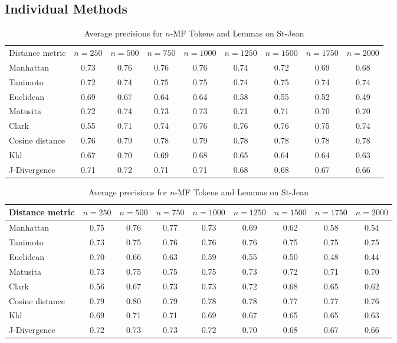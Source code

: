 \subsection{Individual Methods}

\begin{table}[H]
  \centering
  \caption{Average precisions for $n$-MF Tokens and Lemmas on St-Jean}
  \label{tab:tokens_lemmas}

  \label{tab:tokens}
  \begin{tabular}{l c c c c c c c c}
    \toprule
    Distance metric &
    $n=250$ &
    $n=500$ &
    $n=750$ &
    $n=1000$ &
    $n=1250$ &
    $n=1500$ &
    $n=1750$ &
    $n=2000$ \\
    Manhattan       & 0.73 & 0.76 & 0.76 & 0.76 & 0.74 & 0.72 & 0.69 & 0.68 \\
    Tanimoto        & 0.72 & 0.74 & 0.75 & 0.75 & 0.74 & 0.75 & 0.74 & 0.74 \\
    Euclidean       & 0.69 & 0.67 & 0.64 & 0.64 & 0.58 & 0.55 & 0.52 & 0.49 \\
    Matusita        & 0.72 & 0.74 & 0.73 & 0.73 & 0.71 & 0.71 & 0.70 & 0.70 \\
    Clark           & 0.55 & 0.71 & 0.74 & 0.76 & 0.76 & 0.76 & 0.75 & 0.74 \\
    Cosine distance & 0.76 & 0.79 & 0.78 & 0.79 & 0.78 & 0.78 & 0.78 & 0.78 \\
    Kld             & 0.67 & 0.70 & 0.69 & 0.68 & 0.65 & 0.64 & 0.64 & 0.63 \\
    J-Divergence    & 0.71 & 0.72 & 0.71 & 0.71 & 0.68 & 0.68 & 0.67 & 0.66 \\
    \bottomrule
  \end{tabular}

  \vspace{0.5cm}

  \label{tab:lemmas}
  \begin{tabular}{l c c c c c c c c}
    \toprule
    Distance metric &
    $n=250$ &
    $n=500$ &
    $n=750$ &
    $n=1000$ &
    $n=1250$ &
    $n=1500$ &
    $n=1750$ &
    $n=2000$ \\
    \midrule
    Manhattan       & 0.75 & 0.76 & 0.77 & 0.73 & 0.69 & 0.62 & 0.58 & 0.54 \\
    Tanimoto        & 0.73 & 0.75 & 0.76 & 0.76 & 0.76 & 0.75 & 0.75 & 0.75 \\
    Euclidean       & 0.70 & 0.66 & 0.63 & 0.59 & 0.55 & 0.50 & 0.48 & 0.44 \\
    Matusita        & 0.73 & 0.75 & 0.75 & 0.75 & 0.73 & 0.72 & 0.71 & 0.70 \\
    Clark           & 0.56 & 0.67 & 0.73 & 0.73 & 0.72 & 0.68 & 0.65 & 0.62 \\
    Cosine distance & 0.79 & 0.80 & 0.79 & 0.78 & 0.78 & 0.77 & 0.77 & 0.76 \\
    Kld             & 0.69 & 0.71 & 0.71 & 0.69 & 0.67 & 0.65 & 0.65 & 0.63 \\
    J-Divergence    & 0.72 & 0.73 & 0.73 & 0.72 & 0.70 & 0.68 & 0.67 & 0.66 \\
    \bottomrule
  \end{tabular}
\end{table}


